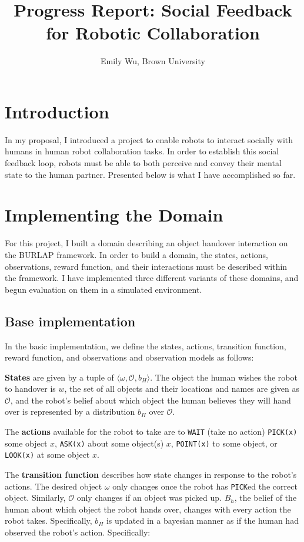 \documentclass{article}
\title{Progress Report: Social Feedback for Robotic Collaboration}
\author{Emily Wu, Brown University}
\begin{document}
\maketitle

\section{Introduction} 

In my proposal, I introduced a project to enable robots to interact socially with humans in human robot collaboration tasks. In order to establish this social feedback loop, robots must be able to both perceive and convey their mental state to the human partner. Presented below is what I have accomplished so far. 

\section{Implementing the Domain}

For this project, I built a domain describing an object handover interaction on the BURLAP framework. In order to build a domain, the states, actions, observations, reward function, and their interactions must be described within the framework. I have implemented three different variants of these domains, and begun evaluation on them in a simulated environment. 

\subsection{Base implementation}

In the basic implementation, we define the states, actions, transition function, reward function, and observations and observation models as follows: 

\textbf{States} are given by a tuple of $\langle \omega, \mathcal{O}, b_H \rangle$. The object the human wishes the robot to handover is $w$, the set of all objects and their locations and names are given as $\mathcal{O}$, and the robot's belief about which object the human believes they will hand over is represented by a distribution $b_H$ over $\mathcal{O}$. 

The \textbf{actions} available for the robot to take are to \texttt{WAIT} (take no action) \texttt{PICK(x)} some object $x$, \texttt{ASK(x)} about some object(s) $x$, \texttt{POINT(x)} to some object, or \texttt{LOOK(x)} at some object $x$. 

The \textbf{transition function} describes how state changes in response to the robot's actions. The desired object $\omega$ only changes once the robot has \texttt{PICK}ed the correct object. Similarly, $\mathcal{O}$ only changes if an object was picked up. $B_h$, the belief of the human about which object the robot hands over, changes with every action the robot takes. Specifically, $b_H$ is updated in a bayesian manner as if the human had observed the robot's action. Specifically: 
\end{document}
